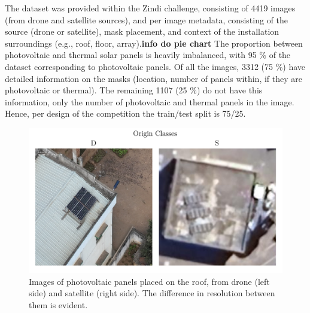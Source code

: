 \documentclass[conference]{IEEEtran}
\begin{document}
The dataset was provided within the Zindi challenge, consisting of 4419 images (from drone and satellite sources), and per image metadata, consisting of the source (drone or satellite), mask placement, and context of the installation surroundings (e.g., roof, floor, array).\textbf{info do pie chart} The proportion between photovoltaic and thermal solar panels is heavily imbalanced, with 95 \% of the dataset corresponding to photovoltaic panels.
Of all the images, 3312 (75 \%) have detailed information on the masks (location, number of panels within, if they are photovoltaic or thermal). The remaining 1107 (25 \%) do not have this information, only the number of photovoltaic and thermal panels in the image. Hence, per design of the competition the train/test split is 75/25.


\begin{figure}[H]
    \centering
    \includegraphics[width=1\linewidth]{assets/data_origin_classes.png}
    \caption{Images of photovoltaic panels placed on the roof, from drone (left side) and satellite (right side). The difference in resolution between them is evident.}
    \label{fig:data_origin_classes}
\end{figure}
\end{document}
